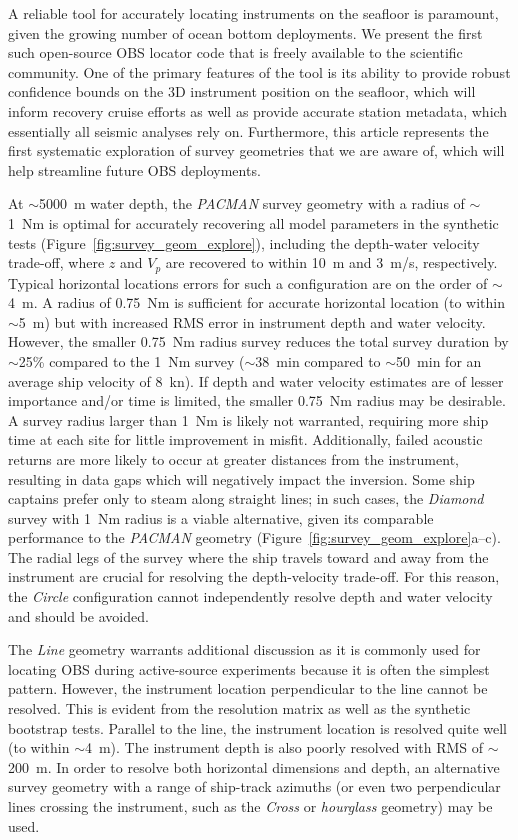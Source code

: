 A reliable tool for accurately locating instruments on the seafloor is paramount, given the growing number of ocean bottom deployments. We present the first such open-source OBS locator code that is freely available to the scientific community. One of the primary features of the tool is its ability to provide robust confidence bounds on the 3D instrument position on the seafloor, which will inform recovery cruise efforts as well as provide accurate station metadata, which essentially all seismic analyses rely on. Furthermore, this article represents the first systematic exploration of survey geometries that we are aware of, which will help streamline future OBS deployments.

At $\sim$5000~m water depth, the \textit{PACMAN} survey geometry with a radius of $\sim$1~Nm is optimal for accurately recovering all model parameters in the synthetic tests (Figure~\ref{fig:survey_geom_explore}), including the depth-water velocity trade-off, where $z$ and $V_p$ are recovered to within 10~m and 3~m/s, respectively. Typical horizontal locations errors for such a configuration are on the order of $\sim$4~m. A radius of 0.75~Nm is sufficient for accurate horizontal location (to within $\sim$5~m) but with increased RMS error in instrument depth and water velocity. However, the smaller 0.75~Nm radius survey reduces the total survey duration by $\sim$25\% compared to the 1~Nm survey ($\sim$38~min compared to $\sim$50~min for an average ship velocity of 8~kn). If depth and water velocity estimates are of lesser importance and/or time is limited, the smaller 0.75~Nm radius may be desirable. A survey radius larger than 1~Nm is likely not warranted, requiring more ship time at each site for little improvement in misfit. Additionally, failed acoustic returns are more likely to occur at greater distances from the instrument, resulting in data gaps which will negatively impact the inversion. Some ship captains prefer only to steam along straight lines; in such cases, the \textit{Diamond} survey with 1~Nm radius is a viable alternative, given its comparable performance to the \textit{PACMAN} geometry (Figure~\ref{fig:survey_geom_explore}a--c). The radial legs of the survey where the ship travels toward and away from the instrument are crucial for resolving the depth-velocity trade-off. For this reason, the \textit{Circle} configuration cannot independently resolve depth and water velocity and should be avoided.

The \textit{Line} geometry warrants additional discussion as it is commonly used for locating OBS during active-source experiments because it is often the simplest pattern. However, the instrument location perpendicular to the line cannot be resolved. This is evident from the resolution matrix as well as the synthetic bootstrap tests. Parallel to the line, the instrument location is resolved quite well (to within $\sim$4~m). The instrument depth is also poorly resolved with RMS of $\sim$200~m. In order to resolve both horizontal dimensions and depth, an alternative survey geometry with a range of ship-track azimuths (or even two perpendicular lines crossing the instrument, such as the \textit{Cross} or \textit{hourglass} geometry) may be used.


